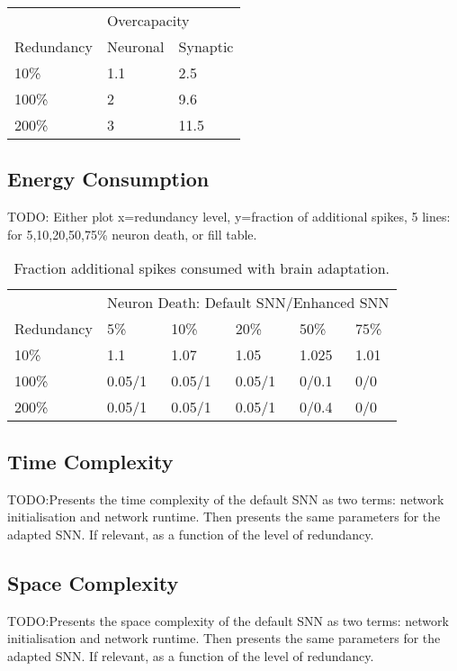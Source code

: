 \begin{table}[H]
\begin{tabular}{lll}
           & \multicolumn{2}{l}{Overcapacity} \\ \cmidrule{2-3}
           Redundancy & Neuronal     & Synaptic                   \\ \hline 
10\%       & 1.1          & 2.5                        \\
100\%      & 2            & 9.6                          \\
200\%      & 3            & 11.5                         
\end{tabular}
\end{table}

\subsection{Energy Consumption}\label{subsec:results_energy_consumption}
TODO: Either plot x=redundancy level, y=fraction of additional spikes, 5 lines: for 5,10,20,50,75\% neuron death, or fill table.
\begin{table}[H]
\caption{Fraction additional spikes consumed with brain adaptation.}
\begin{tabular}{llllll}
           & \multicolumn{5}{l}{Neuron Death: Default SNN/Enhanced SNN} \\ \cmidrule{2-6} %
          Redundancy & 5\%    & 10\%    & 20\%    & 50\%    & 75\%    \\ \hline
10\%       & 1.1    & 1.07     & 1.05       & 1.025       & 1.01       \\
100\%      & 0.05/1      & 0.05/1       & 0.05/1       & 0/0.1     & 0/0       \\
200\%      & 0.05/1      & 0.05/1       & 0.05/1       & 0/0.4     & 0/0      
\end{tabular}
\end{table}

\subsection{Time Complexity}\label{subsec:time_complexity}
TODO:Presents the time complexity of the default SNN as two terms: network initialisation and network runtime. Then presents the same parameters for the adapted SNN. If relevant, as a function of the level of redundancy.

\subsection{Space Complexity}\label{subsec:time_complexity}
TODO:Presents the space complexity of the default SNN as two terms: network initialisation and network runtime. Then presents the same parameters for the adapted SNN. If relevant, as a function of the level of redundancy.
